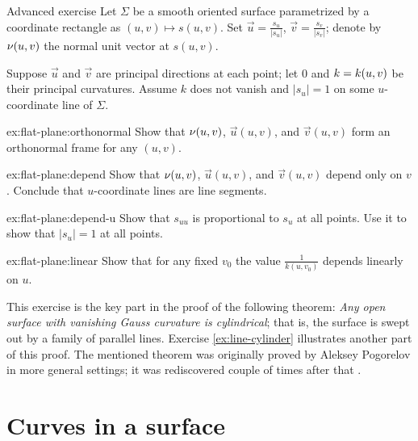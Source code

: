 \begin{thm}{Advanced exercise}\label{ex:flat-plane}
Let $\Sigma$ be a smooth oriented surface parametrized by a coordinate rectangle as $(u,v)\mapsto s(u,v)$.
Set $\vec u=\tfrac{s_u}{|s_u|}$, $\vec v=\tfrac{s_v}{|s_v|}$;
denote by $\nu(u,v)$ the normal unit vector at $s(u,v)$.

Suppose $\vec u$ and $\vec v$ are principal directions at each point;
let $0$ and $k\z=k(u,v)$ be their principal curvatures.
Assume $k$ does not vanish and $|s_u|=1$ on some $u$-coordinate line of $\Sigma$.

\begin{subthm}{ex:flat-plane:orthonormal}
Show that $\nu(u,v)$, $\vec u(u,v)$, and $\vec v(u,v)$ form an orthonormal frame for any $(u,v)$.
\end{subthm}

\begin{subthm}{ex:flat-plane:depend}
Show that $\nu(u,v)$, $\vec u(u,v)$, and $\vec v(u,v)$ depend only on $v$.
Conclude that $u$-coordinate lines are line segments.
\end{subthm}

\begin{subthm}{ex:flat-plane:depend-u}
Show that $s_{uu}$ is proportional to $s_u$ at all points.
Use it to show that $|s_u|=1$ at all points.
\end{subthm}

\begin{subthm}{ex:flat-plane:linear}
Show that for any fixed $v_0$ the value $\tfrac1{k(u,v_0)}$ depends linearly on $u$.
\end{subthm}

\end{thm}

This exercise is the key part in the proof of the following theorem:
\textit{Any open surface with vanishing Gauss curvature is \emph{cylindrical}};
that is, the surface is swept out by a family of parallel lines.
Exercise \ref{ex:line-cylinder} illustrates another part of this proof.
The mentioned theorem was originally proved by Aleksey Pogorelov \cite[II §3 Thm 2]{pogorelov1956} in more general settings; it was rediscovered couple of times after that \cite{hartman-nirenberg,massey1962}.

\chapter{Curves in a surface}\label{chap:Curves in a surface}

